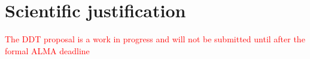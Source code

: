\documentclass[12pt,a4paper]{article}  %
\begin{document}
\pagestyle{plain}
\newcommand{\arcsec}{"}
 



\section{Scientific justification}

\textcolor{red}{The DDT proposal is a work in progress and will not be submitted until after the formal ALMA deadline}

%
%
 
\end{document}
